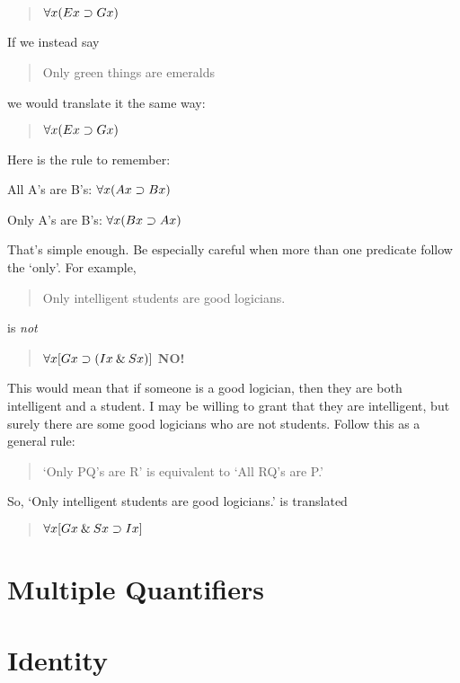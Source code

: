 \documentclass[../logic-text.tex]{subfiles}
\begin{document}
\begin{quote}
  \(\forall x(Ex \supset Gx)\)
\end{quote}


If we instead say

\begin{quote}
  Only green things are emeralds
\end{quote}

we would translate it the same way:

\begin{quote}
  \(\forall x(Ex \supset Gx)\)
\end{quote}

Here is the rule to remember:

All A's are B's: \(\forall x (Ax \supset Bx)\)

Only A's are B's: \(\forall x (Bx \supset Ax)\)

That's simple enough. Be especially careful when more than one predicate follow the \enquote*{only}. 
For example, 

\begin{quote}
Only intelligent students are good logicians.
\end{quote}

is \emph{not}

\begin{quote}
\(\forall x [Gx \supset (Ix \mathbin{\&} Sx)]\) \textbf{NO!}   
\end{quote}

This would mean that if someone is a good logician, then they are both intelligent and a student. I may be willing to grant that they are intelligent, but surely there are some good logicians who are not students. Follow this as a general rule:

\begin{quote}
  \enquote*{Only PQ's are R} is equivalent to \enquote*{All RQ's are P.}
\end{quote}

So, \enquote*{Only intelligent students are good logicians.} is translated

\begin{quote}
\(\forall x [Gx \mathbin{\&} Sx \supset Ix]\)  
\end{quote}












\section{Multiple Quantifiers}
\label{sec:multiple-quantifiers}


\section{Identity}
\label{sec:identity}
\end{document}
